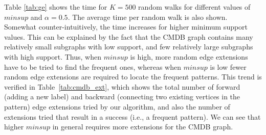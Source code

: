 \smallskip{} Table \ref{tab:ge} shows the time
for $K=500$ random walks for different values of $minsup$ and $\alpha =
0.5$. The average time per random walk is also shown. 
Somewhat counter-intuitively, the time
increases for higher minimum support values. 
This can be
explained by the fact that the CMDB graph contains many relatively
small subgraphs with low support, and few relatively large subgraphs
with high support. Thus, when $minsup$ is high, more random edge 
extensions have to be tried to find the frequent ones,
whereas when $minsup$
is low fewer random edge extensions are required to locate the frequent
patterns.
This trend is verified in Table~\ref{tab:cmdb_ext}, which shows 
the total number of forward (adding a new label) and backward (connecting 
two existing vertices in the pattern) edge extensions tried by our
algorithm, and also the number of extensions tried that result in a
success (i.e., a frequent pattern).
We can see that higher $minsup$ in general requires more extensions for
the CMDB graph.

\begin{comment}
The running time results above include a particular optimization that we
applied for CMDB graphs, given the large multiplicities of the different
label$. For such graphs, the 
support computation procedure can be improved by computing the sets of
equivalent vertices, i.e., vertices that have the same neighborhood and
are indistinguishable. The representative set $R(u)$ of all equivalent
vertices are equal, and thus it has to be computed only once.  In
abstract algebra terms, such vertices belong to an orbit of the
automorphism group of the graph \cite{orbits}.  So, we can prune the
candidate representative sets of all the vertices in an orbit by
matching the labels of any vertex in the orbit with the labels of
vertices in the candidate set. Computing the orbits of an arbitrary
graph is a hard problem. Several heuristics have been proposed to
compute the orbits of a graph \cite{Everett}.  We use a simple heuristic
to find subsets of vertices, common ancestor leaves (CAL) that are
guaranteed to be in the same orbit. These are the subset of leaves that
have the same label and are connected to a common ancestor.  CAL is a
subset $S \subseteq \vg$, such that $\forall u \in S$ and the following
three properties hold true: i) $|N(u)|=1$, ii) $\exists v \in \vg$,
$(v,u) \in \eg$, and  iii) $L(u) = l$  for some $l \in \Sigma$.
An example of CAL is set of all vertices labeled ``9 $\times$ process'' in
figure \ref{fig:gepatsB}; here 9 is the multiplicity of that label. 
CAL sets have to be computed once for every
candidate and this step had negligible impact on the overall run time. 
\end{comment}

